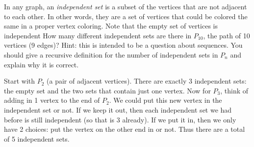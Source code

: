 \begin{questions}





\question[5] In any graph, an \emph{independent set} is a subset of the vertices that are not adjacent to each other.  In other words, they are a set of vertices that could be colored the same in a proper vertex coloring.  Note that the empty set of vertices is independent  How many different independent sets are there in $P_{10}$, the path of 10 vertices (9 edges)?  Hint: this is intended to be a question about sequences.  You should give a recursive definition for the number of independent sets in $P_n$ and explain why it is correct.

\begin{solution}
Start with $P_2$ (a pair of adjacent vertices).  There are exactly 3 independent sets: the empty set and the two sets that contain just one vertex.  Now for $P_3$, think of adding in 1 vertex to the end of $P_2$.  We could put this new vertex in the independent set or not.  If we keep it out, then each independent set we had before is still independent (so that is 3 already).  If we put it in, then we only have 2 choices: put the vertex on the other end in or not.  Thus there are a total of 5 independent sets.


\end{solution}
\end{questions}
